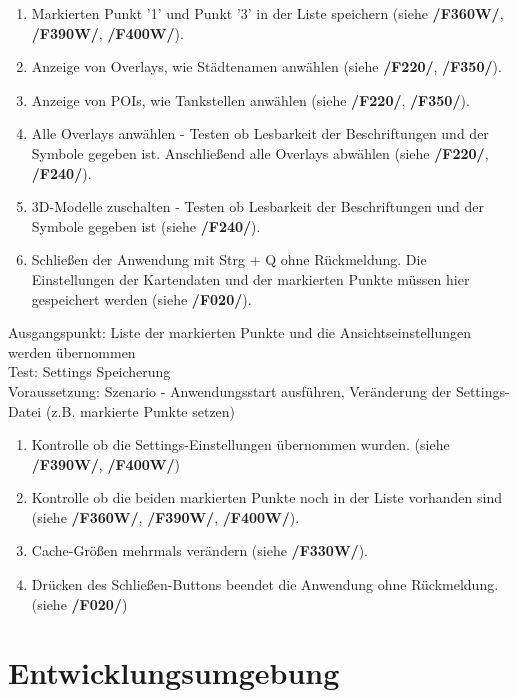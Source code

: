 \documentclass[10pt]{scrreprt}
\begin{document}
\begin{enumerate}[leftmargin = 2.5cm, resume]
\item Markierten Punkt '1' und Punkt '3' in der Liste speichern (siehe \textbf{/F360W/}, \textbf{/F390W/}, \textbf{/F400W/}).
\muss
\item Anzeige von Overlays, wie Städtenamen anwählen (siehe \textbf{/F220/}, \textbf{/F350/}).
\item Anzeige von POIs, wie Tankstellen anwählen (siehe \textbf{/F220/}, \textbf{/F350/}).
\item Alle Overlays anwählen - Testen ob Lesbarkeit der Beschriftungen und der Symbole gegeben ist. Anschließend alle Overlays abwählen (siehe \textbf{/F220/}, \textbf{/F240/}).
\item 3D-Modelle zuschalten - Testen ob Lesbarkeit der Beschriftungen und der Symbole gegeben ist (siehe \textbf{/F240/}).
\item  Schließen der Anwendung mit Strg + Q ohne Rückmeldung. Die Einstellungen der Kartendaten und der markierten Punkte müssen hier gespeichert werden (siehe \textbf{/F020/}).
\end{enumerate}

\vspace{1.0cm}
Ausgangspunkt: Liste der markierten Punkte und die Ansichtseinstellungen werden übernommen \\
Test: Settings Speicherung \\
Voraussetzung: Szenario - Anwendungsstart ausführen, Veränderung der Settings-Datei (z.B. markierte Punkte setzen)
\begin{enumerate}[leftmargin = 2.5cm, resume]
\wunsch
\item Kontrolle ob die Settings-Einstellungen übernommen wurden. (siehe \textbf{/F390W/}, \textbf{/F400W/})
\item Kontrolle ob die beiden markierten Punkte noch in der Liste vorhanden sind (siehe \textbf{/F360W/}, \textbf{/F390W/}, \textbf{/F400W/}).
\item Cache-Größen mehrmals verändern (siehe \textbf{/F330W/}).
\muss
\item Drücken des Schließen-Buttons beendet die Anwendung ohne Rückmeldung. (siehe \textbf{/F020/})
\end{enumerate}



\chapter{Entwicklungsumgebung}
\end{document}
